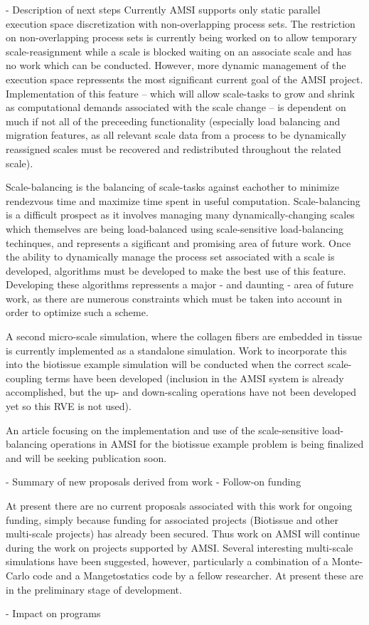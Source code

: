 - Description of next steps
\label{future-work}
Currently AMSI supports only static parallel execution space discretization with non-overlapping process sets. The restriction on non-overlapping process sets is currently being worked on to allow temporary scale-reasignment while a scale is blocked waiting on an associate scale and has no work which can be conducted. However, more dynamic management of the execution space repressents the most significant current goal of the AMSI project. Implementation of this feature -- which will allow scale-tasks to grow and shrink as computational demands associated with the scale change -- is dependent on much if not all of the preceeding functionality (especially load balancing and migration features, as all relevant scale data from a process to be dynamically reassigned scales must be recovered and redistributed throughout the related scale).

Scale-balancing is the balancing of scale-tasks against eachother to minimize rendezvous time and maximize time spent in useful computation. Scale-balancing is a difficult prospect as it involves managing many dynamically-changing scales which themselves are being load-balanced using scale-sensitive load-balancing techinques, and represents a sigificant and promising area of future work. Once the ability to dynamically manage the process set associated with a scale is developed, algorithms must be developed to make the best use of this feature. Developing these algorithms repressents a major - and daunting - area of future work, as there are numerous constraints which must be taken into account in order to optimize such a scheme.

A second micro-scale simulation, where the collagen fibers are embedded in tissue is currently implemented as a standalone simulation. Work to incorporate this into the biotissue example simulation will be conducted when the correct scale-coupling terms have been developed (inclusion in the AMSI system is already accomplished, but the up- and down-scaling operations have not been developed yet so this RVE is not used). \cite{} \cite{} \cite{}

An article focusing on the implementation and use of the scale-sensitive load-balancing operations in AMSI for the biotissue example problem is being finalized and will be seeking publication soon.

- Summary of new proposals derived from work
- Follow-on funding

At present there are no current proposals associated with this work for ongoing funding, simply because funding for associated projects (Biotissue and other multi-scale projects) has already been secured. Thus work on AMSI will continue during the work on projects supported by AMSI. Several interesting multi-scale simulations have been suggested, however, particularly a combination of a Monte-Carlo code and a Mangetostatics code by a fellow researcher. At present these are in the preliminary stage of development.

- Impact on programs